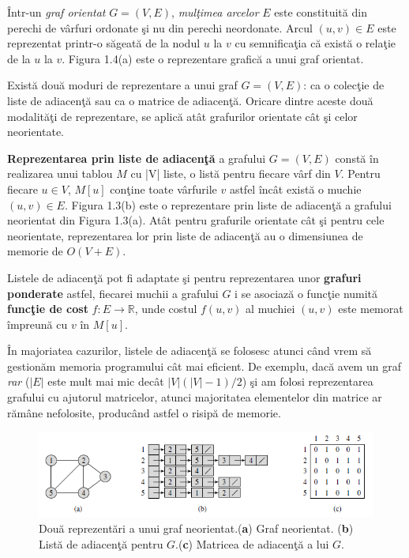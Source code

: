 \documentclass[11pt,a4paper]{report}
\newcommand{\R}{\mathbb{R}}
\begin{document}
\^ Intr-un \textit{graf orientat} \cite{AM} $G=(V,E)$, \textit{mul\c timea arcelor} $E$ este constituit\u a din perechi de v\^ arfuri ordonate \c si nu din perechi neordonate. Arcul $(u,v)\in E$ este reprezentat printr-o s\u ageat\u a de la nodul $u$ la $v$ cu semnifica\c tia c\u a exist\u a o rela\c tie de la $u$ la $v$. Figura 1.4(a) este o reprezentare grafic\u a a unui graf orientat.   
   
    Exist\u a dou\u a moduri de reprezentare a unui graf $G=(V,E)$: ca o colec\c tie de liste de adiacen\c t\u a sau ca o matrice de adiacen\c t\u a. Oricare dintre aceste dou\u a  modalit\u a\c ti de reprezentare, se aplic\u a at\^ at grafurilor orientate c\^ at \c si celor neorientate.
    
    \textbf{Reprezentarea prin liste de adiacen\c t\u a} \cite{Cormen} a grafului $G=(V,E)$ const\u a \^ in realizarea unui tablou $M$ cu |V| liste, o list\u a pentru fiecare v\^ arf din $V$. Pentru fiecare $u\in V$, $M[u]$ con\c tine toate v\^ arfurile $v$ astfel \^ inc\^ at exist\u a o muchie $(u,v)\in E$. Figura 1.3(b) este o reprezentare prin liste de adiacen\c t\u a a grafului neorientat din Figura 1.3(a). At\^ at pentru grafurile orientate c\^ at \c si pentru cele neorientate, reprezentarea lor prin liste de adiacen\c t\u a au o dimensiunea de memorie de $O(V+E)$.
    
    Listele de adiacen\c t\u a pot fi adaptate \c si pentru reprezentarea unor \textbf{grafuri ponderate} astfel, fiecarei muchii a grafului $G$ i se asociaz\u a o func\c tie numit\u a \textbf{func\c tie de cost} $f :E\to \R $, unde costul $f(u,v)$ al muchiei $(u,v)$ este memorat \^ impreun\u a cu $v$ \^ in $M[u]$. 
    
    \^ In majoriatea cazurilor, listele de adiacen\c t\u a se folosesc atunci c\^ and vrem s\u a gestion\u am memoria programului c\^ at mai eficient. De exemplu, dac\u a avem un graf \textit{rar} ($|E|$ este mult mai mic dec\^ at $|V|(|V|-1)/2$) \c si am folosi reprezentarea grafului cu ajutorul matricelor, atunci majoritatea elementelor din matrice ar r\u am\^ ane nefolosite, produc\^ and astfel o risip\u a de memorie.
    	\begin{figure}[!hbt]
    	\centering
    	\includegraphics[width=13.2cm]{Figura4.png}
    	\caption{Dou\u a reprezent\u ari a unui graf neorientat.(\textbf{a}) Graf  neorientat. \centering \newline(\textbf{b}) List\u a de adiacen\c t\u a pentru $G$.(\textbf{c}) Matricea de adiacen\c t\u a a lui $G$.}
    \end{figure}
\end{document}
